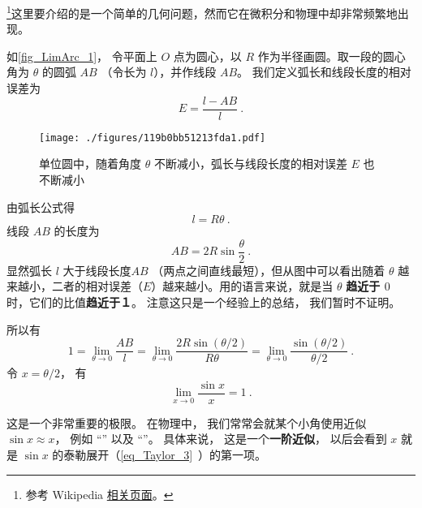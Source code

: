 

\footnote{参考 Wikipedia \href{https://en.wikipedia.org/wiki/Small-angle_approximation}{相关页面}。}这里要介绍的是一个简单的几何问题，然而它在微积分和物理中却非常频繁地出现。

如\autoref{fig_LimArc_1}， 令平面上 $O$ 点为圆心，以 $R$ 作为半径画圆。取一段的圆心角为 $\theta $ 的圆弧 $AB$ （令长为 $l$），并作线段 $AB$。 我们定义弧长和线段长度的相对误差为
\begin{equation}
E = \frac{l - AB}{l}~.
\end{equation}

\begin{figure}[ht]
\centering
\texttt{[image: ./figures/119b0bb51213fda1.pdf]}
\caption{单位圆中，随着角度 $\theta$ 不断减小，弧长与线段长度的相对误差 $E$ 也不断减小}\label{fig_LimArc_1}
\end{figure}

由弧长公式得
\begin{equation} \label{eq_LimArc_1}
l = R\theta ~.
\end{equation}
线段 $AB$ 的长度为
\begin{equation}\label{eq_LimArc_2}
AB = 2R\sin \frac{\theta }{2}~.
\end{equation}
显然弧长 $l$ 大于线段长度$AB$ （两点之间直线最短），但从图中可以看出随着 $\theta $ 越来越小，二者的相对误差（$E$）越来越小。用的语言来说，就是当 $\theta $ \textbf{趋近于 $0$ } 时，它们的比值\textbf{趋近于１}。 注意这只是一个经验上的总结， 我们暂时不证明。

所以有
\begin{equation}
1=\lim_{\theta\to 0} \frac{AB}{l} = \lim_{\theta\to 0} \frac{2R\sin (\theta/2)}{R\theta} 
= \lim_{\theta\to 0}\frac{\sin (\theta/2)}{\theta/2}~.
\end{equation}
令 $x = \theta/2$， 有
\begin{equation}
\lim_{x\to 0} \frac{\sin x}{x} = 1~.
\end{equation}

这是一个非常重要的极限。 在物理中， 我们常常会就某个小角使用近似 $\sin x \approx x$， 例如 “” 以及 “”。 具体来说， 这是一个\textbf{一阶近似}，  以后会看到 $x$ 就是 $\sin x$ 的泰勒展开（\autoref{eq_Taylor_3}~）的第一项。

